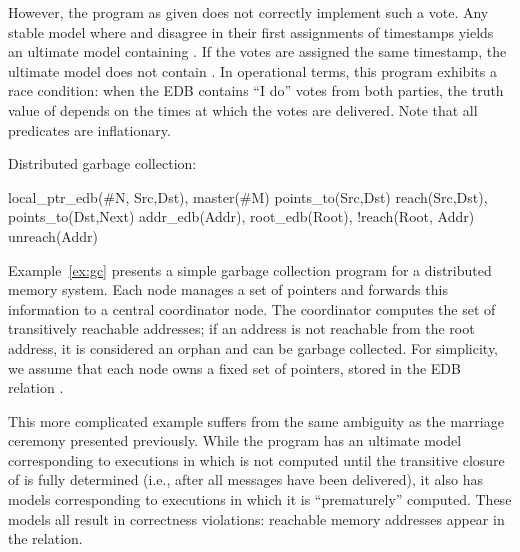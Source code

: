 However, the \lang program as given does not correctly implement such a vote.
Any stable model where  and 
disagree in their first assignments of timestamps yields an ultimate model
containing .  If the votes are assigned the same timestamp,
the ultimate model does not contain . In operational terms,
this program exhibits a race condition: when the EDB contains ``I do'' votes
from both parties, the truth value of  depends on the times
at which the votes are delivered. Note that all predicates are inflationary.

\begin{example}
\label{ex:gc}
Distributed garbage collection:

\begin{Drules}
        {local_ptr_edb(#N, Src,Dst), master(#M)}
        {points_to(Src,Dst)}
        {reach(Src,Dst), points_to(Dst,Next)}
        {addr_edb(Addr), root_edb(Root), !reach(Root, Addr)}
   {unreach(Addr)}
\end{Drules}
\end{example}
Example~\ref{ex:gc} presents a simple garbage collection program for a
distributed memory system. Each node manages a set of pointers and forwards this
information to a central coordinator node. The coordinator computes the set of
transitively reachable addresses; if an address is not reachable from the root
address, it is considered an orphan and can be garbage collected. For
simplicity, we assume that each node owns a fixed set of pointers, stored in the
EDB relation . 

This more complicated example suffers from the same ambiguity as the marriage
ceremony presented previously.  While the program has an ultimate model
corresponding to executions in which  is not computed until the
transitive closure of  is fully determined (i.e., after all
messages have been delivered), it also has models corresponding to executions in
which it is ``prematurely'' computed.  These models all result in correctness
violations: reachable memory addresses appear in the  relation.


